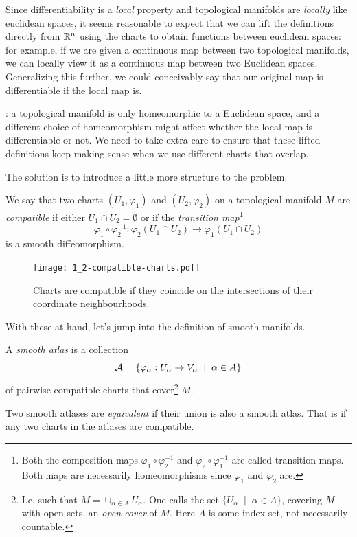 Since differentiability is a \emph{local} property and topological manifolds are \emph{locally} like euclidean spaces, it seems reasonable to expect that we can lift the definitions directly from $\mathbb{R}^n$ using the charts to obtain functions between euclidean spaces:
for example, if we are given a continuous map between two topological manifolds, we can locally view it as a continuous map between two Euclidean spaces.
Generalizing this further, we could conceivably say that our original map is differentiable if the local map is.

: a topological manifold is only homeomorphic to a Euclidean space, and a different choice of homeomorphism might affect whether the local map is differentiable or not.
We need to take extra care to ensure that these lifted definitions keep making sense when we use different charts that overlap.

The solution is to introduce a little more structure to the problem.

\begin{definition}\label{def:crcomp}
We say that two charts $(U_1, \varphi_1)$ and $(U_2, \varphi_2)$ on a topological manifold $M$ are \emph{compatible} if either $U_1 \cap U_2 = \emptyset$ or if the \emph{transition map}\footnote{Both the composition maps $\varphi_1 \circ \varphi_2^{-1}$ and $\varphi_2 \circ \varphi_1^{-1}$ are called transition maps. Both maps are necessarily homeomorphisms since $\varphi_1$ and $\varphi_2$ are.}
\begin{equation}
  \varphi_1 \circ \varphi_2^{-1} : \varphi_2(U_1\cap U_2) \to \varphi_1(U_1 \cap U_2)
\end{equation}
is a smooth diffeomorphism.
\end{definition}

\begin{figure}[htp]
  \centering
  \texttt{[image: 1\_2-compatible-charts.pdf]}
  \caption{Charts are compatible if they coincide on the intersections of their coordinate neighbourhoods.}
  \label{fig:1.2-compatible-charts}
\end{figure}

With these at hand, let's jump into the definition of smooth manifolds.

\begin{definition}\label{def:cratlas}
  A \emph{smooth atlas} is a collection
  \begin{equation}
    \mathcal{A} = \{\varphi_\alpha: U_\alpha \to V_\alpha \;\mid\; \alpha\in A\}
  \end{equation}
  of pairwise compatible charts that cover\footnote{I.e. such that $M = \cup_{\alpha\in A} U_\alpha$. One calls the set $\{U_\alpha \;\mid\; \alpha\in A\}$, covering $M$ with open sets, an \emph{open cover} of $M$. Here $A$ is some index set, not necessarily countable.} $M$.

  Two smooth atlases are \emph{equivalent} if their union is also a smooth atlas. That is if any two charts in the atlases are compatible.
\end{definition}

